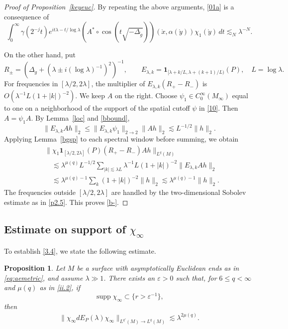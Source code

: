 \documentclass[11pt]{amsart}
\newcommand{\la}{\lambda}
\newtheorem{proposition}{Proposition}[section]
\begin{document}
\begin{proof}[Proof of Proposition~\ref{keyeuc}]
By repeating the above arguments, \eqref{01a} is a consequence of 
\begin{equation}\label{20b}
\int_0^\infty \gamma(2^{-j}t)e^{it\la-t/\log\la}   (A^*\circ \cos (t\sqrt{-\Delta_{\mathring g}}))(\mathring x,\alpha(\mathring y))\chi_1(\mathring y)\,dt \lesssim_N \la^{-N}.
\end{equation}

On the other hand, put
\[
R_\pm=(\Delta_g+(\la\pm i(\log\la)^{-1})^2)^{-1},\qquad
E_{\la,k}=\mathbf{1}_{[\la+k/L,\la+(k+1)/L)}(P),
\quad L=\log\la.
\]
For frequencies in $[\la/2,2\la]$, the multiplier of $E_{\la,k}(R_+-R_-)$ is $O(\la^{-1}L(1+|k|)^{-2})$. We keep $A$ on the right. Choose $\psi_1\in C_0^\infty(M_\infty)$ equal to one on a neighborhood of the support of the spatial cutoff $\psi$ in \eqref{10}. Then $A=\psi_1A$. By Lemma~\ref{loc} and \eqref{bbound},
\[
\|E_{\la,k}Ah\|_2\leq\|E_{\la,k}\psi_1\|_{2\to2}\|Ah\|_2
\lesssim L^{-1/2}\|h\|_2.
\]
Applying Lemma~\ref{bgsp} to each spectral window before summing, we obtain
\begin{align*}
&\|\chi_1\mathbf{1}_{[\la/2,2\la]}(P)(R_+-R_-)Ah\|_{L^q(M)}\\
&\quad\lesssim\la^{\mu(q)}L^{-1/2}
\sum_{|k|\lesssim\la L}\la^{-1}L(1+|k|)^{-2}\|E_{\la,k}Ah\|_2\\
&\quad\lesssim\la^{\mu(q)-1}\sum_k(1+|k|)^{-2}\|h\|_2
\lesssim\la^{\mu(q)-1}\|h\|_2.
\end{align*}
The frequencies outside $[\la/2,2\la]$ are handled by the two-dimensional Sobolev estimate as in \eqref{p2.5}. This proves \eqref{b-}.
\end{proof}

\subsection{Estimate on support of $\chi_\infty$}

To establish \eqref{3.4}, we state the following estimate.

\begin{proposition}\label{new}
Let $M$ be a surface with asymptotically Euclidean ends as in \eqref{eq:aemetric}, and assume $\la\gg1$. There exists an $\varepsilon>0$ such that, for $6\leq q<\infty$ and $\mu(q)$ as in \eqref{ii.2}, if
\[
\operatorname{supp}\chi_\infty
\subset\{r>\varepsilon^{-1}\},
\]
then
\begin{align}
\|\chi_\infty dE_P(\la)\chi_\infty\|_{L^{q'}(M)\to L^q(M)}
\lesssim \la^{2\mu(q)}.
\end{align}
\end{proposition}
\end{document}
